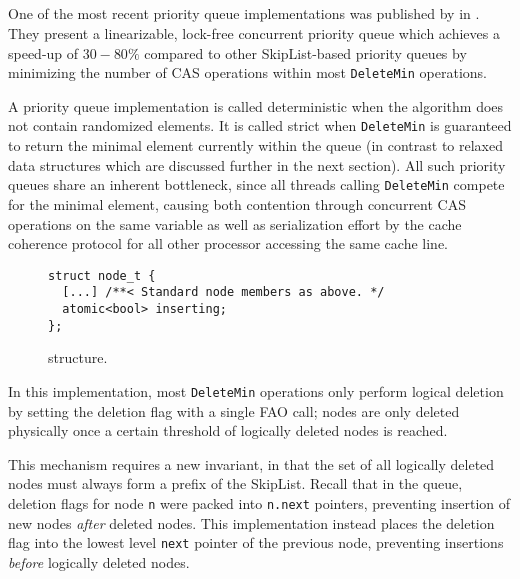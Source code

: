 \subsection{\citeauthor{linden2013skiplist}} \label{sec:linden}

One of the most recent priority queue implementations was published by \citeauthor{linden2013skiplist}
in \citeyear{linden2013skiplist} \cite{linden2013skiplist}. They present a linearizable, lock-free concurrent priority
queue which achieves a speed-up of $30-80\%$ compared to other SkipList-based priority queues by
minimizing the number of \ac{CAS} operations within most \lstinline|DeleteMin| operations.

A priority queue implementation is called deterministic when the algorithm does not contain randomized elements.
It is called strict when \lstinline|DeleteMin| is guaranteed to return the minimal element currently within the queue
(in contrast to relaxed data structures which are discussed further in the next section).
All such priority queues share an inherent bottleneck, since all threads calling \lstinline|DeleteMin| compete
for the minimal element, causing both contention through concurrent \ac{CAS} operations on the same variable
as well as serialization effort by the cache coherence protocol for all other processor accessing the same cache
line.

\begin{figure}[ht]
\begin{lstlisting}
struct node_t {
  [...] /**< Standard node members as above. */
  atomic<bool> inserting;
};
\end{lstlisting}
\caption{\citeauthor{linden2013skiplist} structure.}
\label{fig:lindensl}
\end{figure}

In this implementation, most \lstinline|DeleteMin| operations only perform logical deletion by setting
the deletion flag with a single \ac{FAO} call; nodes are only deleted physically once a certain
threshold of logically deleted nodes is reached.

This mechanism requires a new invariant, in that the set of all logically deleted nodes must always
form a prefix of the SkipList. Recall that in the \citeauthor{sundell2003fast} queue, deletion flags
for node \lstinline|n| were packed into \lstinline|n.next| pointers, preventing insertion of new
nodes \emph{after} deleted nodes. This implementation instead places the deletion flag into the
lowest level \lstinline|next| pointer of the previous node, preventing insertions \emph{before}
logically deleted nodes.


